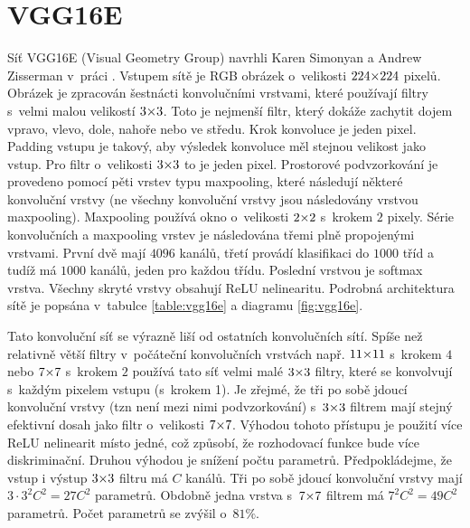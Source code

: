 \section{VGG16E}
\label{sec:vgg16e}

Síť VGG16E (Visual Geometry Group) navrhli Karen Simonyan a Andrew Zisserman v~práci \cite{Simonyan2015}.
Vstupem sítě je RGB obrázek o~velikosti $\sisetup{tight-spacing=true}224{\times}224$ pixelů.
Obrázek je zpracován šestnácti konvolučními vrstvami, které používají filtry s~velmi malou velikostí $\sisetup{tight-spacing=true}3{\times}3$.
Toto je nejmenší filtr, který dokáže zachytit dojem vpravo, vlevo, dole, nahoře nebo ve středu.
Krok konvoluce je jeden pixel.
Padding vstupu je takový, aby výsledek konvoluce měl stejnou velikost jako vstup.
Pro filtr o~velikosti $\sisetup{tight-spacing=true}3{\times}3$ to je jeden pixel.
Prostorové podvzorkování je provedeno pomocí pěti vrstev typu maxpooling, které následují některé konvoluční vrstvy (ne všechny konvoluční vrstvy jsou následovány vrstvou maxpooling).
Maxpooling používá okno o~velikosti $\sisetup{tight-spacing=true}2{\times}2$ s~krokem $2$ pixely.
Série konvolučních a maxpooling vrstev je následována třemi plně propojenými vrstvami.
První dvě mají $4096$ kanálů, třetí provádí klasifikaci do $1000$ tříd a tudíž má $1000$ kanálů, jeden pro každou třídu.
Poslední vrstvou je softmax vrstva.
Všechny skryté vrstvy obsahují ReLU nelinearitu.
Podrobná architektura sítě je popsána v~tabulce \ref{table:vgg16e} a diagramu \ref{fig:vgg16e}.

Tato konvoluční síť se výrazně liší od ostatních konvolučních sítí.
Spíše než relativně větší filtry v~počáteční konvolučních vrstvách např. $\sisetup{tight-spacing=true}11{\times}11$ s~krokem $4$ \cite{Krizhevsky2012} nebo $\sisetup{tight-spacing=true}7{\times}7$ s~krokem $2$ \cite{Sermanet2013} používá tato síť velmi malé $\sisetup{tight-spacing=true}3{\times}3$ filtry, které se konvolvují s~každým pixelem vstupu (s~krokem 1).
Je zřejmé, že tři po sobě jdoucí konvoluční vrstvy (tzn není mezi nimi podvzorkování) s~$\sisetup{tight-spacing=true}3{\times}3$ filtrem mají stejný efektivní dosah jako filtr o~velikosti $\sisetup{tight-spacing=true}7{\times}7$.
Výhodou tohoto přístupu je použití více ReLU nelinearit místo jedné, což způsobí, že rozhodovací funkce bude více diskriminační.
Druhou výhodou je snížení počtu parametrů.
Předpokládejme, že vstup i výstup $\sisetup{tight-spacing=true}3{\times}3$ filtru má $C$ kanálů.
Tři po sobě jdoucí konvoluční vrstvy mají $3\cdot 3^2C^2=27C^2$ parametrů.
Obdobně jedna vrstva s~$\sisetup{tight-spacing=true}7{\times}7$ filtrem má  $7^2C^2=49C^2$ parametrů.
Počet parametrů se zvýšil o~$81\%$.

